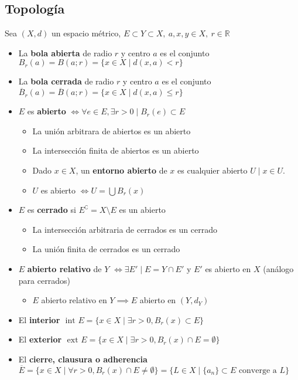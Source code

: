 \documentclass[a4paper,twocolumn]{extarticle}
\newcommand{\R}{\mathbb{R}}
\newcommand{\Int}{\text{ int }}
\newcommand{\Ext}{\text{ ext }}
\begin{document}
\subsection{Topología}
Sea $(X,d)$ un espacio métrico, $E \subset Y \subset X,\ a, x, y \in X,\ r \in \R$
\begin{itemize}
	\item La \textbf{bola abierta} de radio $r$ y centro $a$ es el conjunto $B_r(a) = B(a; r) = \{x \in X \mid d(x, a) < r\}$
	\item La \textbf{bola cerrada} de radio $r$ y centro $a$ es el conjunto $\overline{B}_r(a) = \overline{B}(a;r) = \{x \in X \mid d(x, a) \leq r\}$
	\item $E$ es \textbf{abierto} $\iff \forall e \in E, \exists r > 0 \mid B_r(e) \subset E$
	\begin{itemize}
		\item La unión arbitrara de abiertos es un abierto
		\item La intersección finita de abiertos es un abierto
		\item Dado $x \in X$, un \textbf{entorno abierto} de $x$ es cualquier abierto $U \mid x \in U$.
		\item $U$ es abierto $\iff U = \bigcup B_r(x)$
	\end{itemize}
	\item $E$ es \textbf{cerrado} si $E^\complement = X \setminus E$ es un abierto
	\begin{itemize}
		\item La intersección arbitraria de cerrados es un cerrado
		\item La unión finita de cerrados es un cerrado
	\end{itemize}
	\item $E$ \textbf{abierto relativo} de $Y$ $\iff \exists E' \mid E = Y \cap E'$ y $E'$ es abierto en $X$ (análogo para cerrados)
	\begin{itemize}
		\item $E$ abierto relativo en $Y \implies E$ abierto en $(Y, d_Y)$ 
	\end{itemize}
	\item El \textbf{interior} $\Int E = \{x \in X \mid \exists r > 0, B_r(x) \subset E\}$
	\item El \textbf{exterior} $\Ext E = \{x \in X \mid \exists r > 0, B_r(x) \cap E = \emptyset\}$
	\item El \textbf{cierre, clausura o adherencia} $\overline{E} = \{x \in X \mid \forall r > 0, B_r(x) \cap E \neq \emptyset\}  = \{L \in X \mid \{a_n\} \subset E \text{ converge a } L\}$

\end{itemize}
\end{document}
